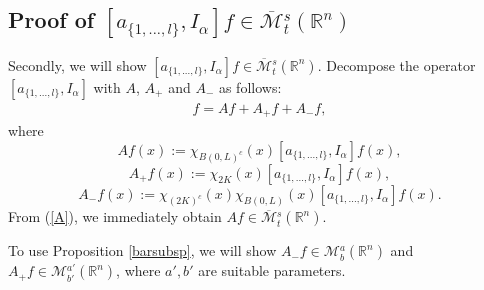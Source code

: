 \documentclass[11pt,a4]{article}
\numberwithin{equation}{section}
\theoremstyle{definition}
\theoremstyle{remark}
\begin{document}
\subsection{Proof of $[a_{\{1, ... , l\}},I_{\alpha}]f \in \overline{{\mathcal M}}{}^s_t({\mathbb R}^n)$}
Secondly, we will show $[a_{\{1, ... , l\}},I_{\alpha}]f \in \overline{{\mathcal M}}{}^s_t({\mathbb R}^n)$. Decompose the operator $[a_{\{1, ... , l\}},I_{\alpha}]$ with $A$, $A_+$ and $A_-$ as follows:
\begin{align*}
	[a_{\{1, ... , l\}},I_{\alpha}]f=Af+A_+f+A_-f,
\end{align*}
where
\begin{equation*}
	Af(x):=\chi_{B(0,L)^c}(x) [a_{\{1, ... , l\}},I_{\alpha}]f(x),
\end{equation*}
\begin{equation*}
	A_+f(x):=\chi_{2K}(x) [a_{\{1, ... , l\}},I_{\alpha}]f(x),
\end{equation*}
\begin{equation*}	
	A_-f(x):=\chi_{(2K)^c}(x) \chi_{B(0,L)}(x) [a_{\{1, ... , l\}},I_{\alpha}]f(x).
\end{equation*}
From (\ref{A}), we immediately obtain $Af \in \overline{{\mathcal M}}{}^s_t({\mathbb R}^n)$.

To use Proposition \ref{barsubsp}, we will show $A_-f \in {\mathcal M}{}^a_b({\mathbb R}^n)$ and $A_+f \in {\mathcal M}{}^{a'}_{b'}({\mathbb R}^n)$, where $a',b'$ are suitable parameters.
\end{document}
